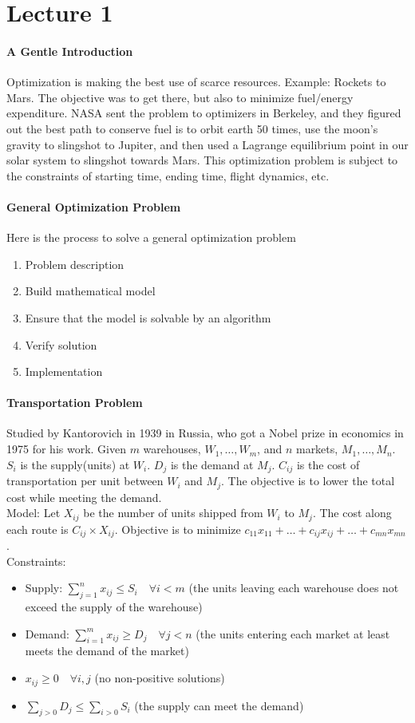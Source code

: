 \documentclass[10pt,letter]{article}
\theoremstyle{plain}
\theoremstyle{definition}
\begin{document}
\section*{Lecture 1}
\paragraph{A Gentle Introduction}
Optimization is making the best use of scarce resources. Example: Rockets to Mars. The objective was to get there, but also to minimize fuel/energy expenditure. NASA sent the problem to optimizers in Berkeley, and they figured out the best path to conserve fuel is to orbit earth 50 times, use the moon's gravity to slingshot to Jupiter, and then used a Lagrange equilibrium point in our solar system to slingshot towards Mars. This optimization problem is subject to the constraints of starting time, ending time, flight dynamics, etc.

\paragraph{General Optimization Problem}
Here is the process to solve a general optimization problem
\begin{enumerate}
    \item Problem description 
    \item Build mathematical model
    \item Ensure that the model is solvable by an algorithm 
    \item Verify solution
    \item Implementation
\end{enumerate}

\paragraph{Transportation Problem}
Studied by Kantorovich in 1939 in Russia, who got a Nobel prize in economics in 1975 for his work. Given $m$ warehouses, $W_1,\ldots,W_m$, and $n$ markets, $M_1,\ldots,M_n$. $S_i$ is the supply(units) at $W_i$. $D_j$ is the demand at $M_j$. $C_{ij}$ is the cost of transportation per unit between $W_i$ and $M_j$. The objective is to lower the total cost while meeting the demand. \\ 
Model: Let $X_{ij}$ be the number of units shipped from $W_i$ to $M_j$. The cost along each route is $C_{ij}\times X_{ij}$. Objective is to minimize $c_{11}x_{11}+\ldots+c_{ij}x_{ij}+\ldots+c_{mn}x_{mn}$.\\ 
Constraints: \begin{itemize}
    \item Supply: $\sum_{j=1}^n x_{ij}\leq S_i\quad\forall i<m$ (the units leaving each warehouse does not exceed the supply of the warehouse) 
    \item Demand: $\sum_{i=1}^m x_{ij}\geq D_j\quad\forall j<n$ (the units entering each market at least meets the demand of the market) 
    \item $x_{ij}\geq0\quad\forall i,j$ (no non-positive solutions)
    \item $\sum_{j>0}D_j\leq\sum_{i>0}S_i$ (the supply can meet the demand)
\end{itemize}
\end{document}
